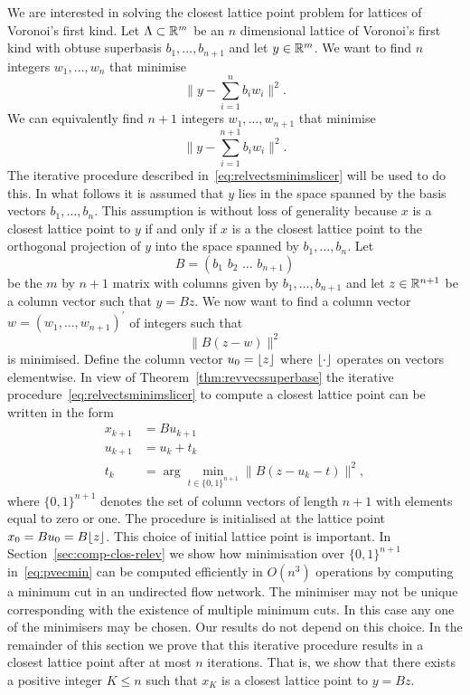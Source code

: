 \documentclass[final,leqno]{siamltex}
\begin{document}
We are interested in solving the closest lattice point problem for lattices of Voronoi's first kind.  Let $\Lambda \subset {\mathbb R}^m$ be an $n$ dimensional lattice of Voronoi's first kind with obtuse superbasis $b_1,\dots,b_{n+1}$ and let $y \in {\mathbb R}^m$.  We want to find $n$ integers $w_1,\dots,w_n$ that minimise
\[
\| y - \sum_{i=1}^n b_i w_i \|^2.
\]
We can equivalently find $n+1$ integers $w_1,\dots,w_{n+1}$ that minimise
\[
\| y - \sum_{i=1}^{n+1} b_i w_i \|^2.
\]
The iterative procedure described in~\eqref{eq:relvectsminimslicer} will be used to do this.  In what follows it is assumed that $y$ lies in the space spanned by the basis vectors $b_1,\dots,b_{n}$.  This assumption is without loss of generality because $x$ is a closest lattice point to $y$ if and only if $x$ is a the closest lattice point to the orthogonal projection of $y$ into the space spanned by $b_1,\dots,b_{n}$.  Let
\[
B = (b_1\,\,b_2\,\,\dots\,\,b_{n+1})
\]
be the $m$ by $n+1$ matrix with columns given by $b_1,\dots,b_{n+1}$ and let $z \in {\mathbb R}^{n+1}$ be a column vector such that $y = Bz$.  We now want to find a column vector $w = (w_1,\dots,w_{n+1})^\prime$ of integers such that
\begin{equation}\label{eq:tominimise}
\| B(z  -  w) \|^2
\end{equation}
is minimised.  Define the column vector $u_0 = {\left\lfloor z \right\rfloor}$ where ${\left\lfloor \cdot \right\rfloor}$ operates on vectors elementwise. In view of Theorem~\ref{thm:revvecssuperbase} the iterative procedure~\eqref{eq:relvectsminimslicer} to compute a closest lattice point can be written in the form
\begin{align}
x_{k+1} &= B u_{k+1} \label{eq:xseqfirsttype}  \\
u_{k+1} &= u_k + t_k \nonumber \\
t_k &= \arg\min_{t \in \{0,1\}^{n+1}}\| B(z - u_k - t) \|^2, \label{eq:pvecmin}
\end{align}
where $\{0,1\}^{n+1}$ denotes the set of column vectors of length $n+1$ with elements equal to zero or one.  The procedure is initialised at the lattice point $x_0 = Bu_0 = B{\left\lfloor z \right\rfloor}$.  This choice of initial lattice point is important.  In Section~\ref{sec:comp-clos-relev} we show how minimisation over $\{0,1\}^{n+1}$ in~\eqref{eq:pvecmin} can be computed efficiently in $O(n^3)$ operations by computing a minimum cut in an undirected flow network.  The minimiser may not be unique corresponding with the existence of multiple minimum cuts.  In this case any one of the minimisers may be chosen.  Our results do not depend on this choice.   In the remainder of this section we prove that this iterative procedure results in a closest lattice point after at most $n$ iterations.  That is, we show that there exists a positive integer $K \leq n$ such that $x_K$ is a closest lattice point to $y = Bz$.
\end{document}
